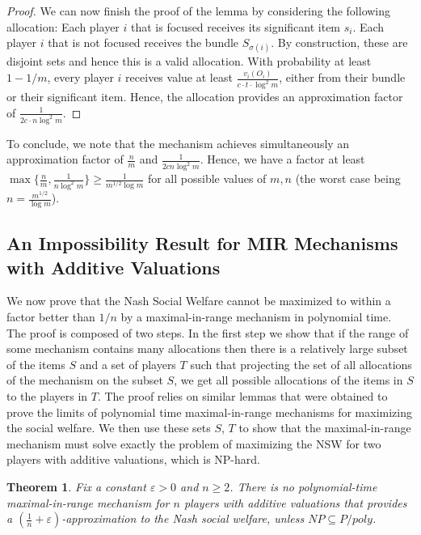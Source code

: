 \documentclass{article}
\newtheorem{theorem}{Theorem}\newtheorem{lemma}[theorem]{Lemma}\newtheorem{proposition}[theorem]{Proposition}\newtheorem{corollary}[theorem]{Corollary}\newtheorem{definition}[theorem]{Definition}\newtheorem{claim}[theorem]{Claim}\newtheorem*{claim*}{Claim}\newenvironment{subproof}{\begin{proof}[Proof of claim]}{\end{proof}}
\newcommand{\eps}{\varepsilon}
\begin{document}
\begin{proof}
We can now finish the proof of the lemma by considering the following allocation: Each player $i$ that is focused receives its significant item $s_i$. Each player $i$ that is not focused receives the bundle $S_{\sigma(i)}$. By construction, these are disjoint sets and hence this is a valid allocation. With probability at least $1-1/m$, every player $i$ receives value at least $\frac{v_i(O_i)}{c \cdot t \cdot \log^2 m}$, either from their bundle or their significant item.
Hence, the allocation provides an approximation factor of $\frac{1} {2c \cdot n \log^2 m}$.
\end{proof}

To conclude, we note that the mechanism achieves simultaneously an approximation factor of $\frac{n}{m}$ and $\frac{1}{2c n \log^2 m}$. 
Hence, we have a factor at least $\max \{\frac n m, \frac{1}{n \log^2 m} \} \geq \frac{1}{m^{1/2} \log m}$ for all possible values of $m,n$ (the worst case being $n = \frac{m^{1/2}}{\log m}$).



\subsection{An Impossibility Result for MIR Mechanisms with Additive Valuations}\label{subsec-hardness}

We now prove that the Nash Social Welfare cannot be maximized to within a factor better than $1/n$ by a maximal-in-range mechanism in polynomial time. The proof is composed of two steps. In the first step we show that if the range of some mechanism contains many allocations then there is a relatively large subset of the items $S$ and a set of players $T$ such that projecting the set of all allocations of the mechanism on the subset $S$, we get all possible allocations of the items in $S$ to the players in $T$. The proof relies on similar lemmas that were obtained to prove the limits of polynomial time maximal-in-range mechanisms for maximizing the social welfare. We then use these sets $S$, $T$ to show that the maximal-in-range mechanism must solve exactly the problem of maximizing the NSW for two players with additive valuations, which is NP-hard.


\begin{theorem}
Fix a constant $\eps>0$ and $n \geq 2$. There is no polynomial-time maximal-in-range mechanism for $n$ players with additive valuations that provides a $(\frac{1}{n}+\eps)$-approximation to the Nash social welfare, unless $NP\subseteq P/poly$.
\end{theorem}
\end{document}
